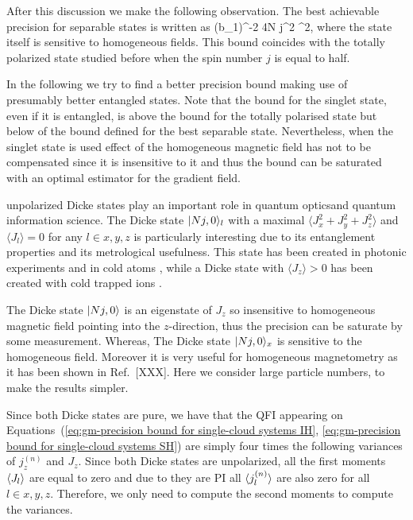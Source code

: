 After this discussion we make the following observation. The best achievable precision for separable states is written as
\be
(\Delta b_1)^{-2} \leqslant 4N j^2 \sigma^2,
\label{eq:gm-best_separable}
\ee
where the state itself is sensitive to homogeneous fields.
This bound coincides with the totally polarized state studied before when the spin number $j$ is equal to half.
\label{obs:precision bound for separable states}

In the following we try to find a better precision bound making use of presumably better entangled states.
Note that the bound for the singlet state, even if it is entangled, is above the bound for the totally polarised state but below of the bound defined for the best separable state.
Nevertheless, when the singlet state is used effect of the homogeneous magnetic field has not to be compensated since it is insensitive to it and thus the bound can be saturated with an optimal estimator for the gradient field.


unpolarized Dicke states play an important role in quantum opticsand quantum information science.
The Dicke state $\vert{Nj,0}\rangle_l$ with a maximal $\langle J_x^2+J_y^2+J_z^2 \rangle$ and $\langle J_l\rangle=0$ for any $l\in x,y,z$ is particularly interesting due to its entanglement properties and its metrological usefulness.
This state has been created in photonic experiments \cite{Kiesel2007,Wieczorek2009,Chiuri2012} and in cold atoms \cite{Luecke2011,Hamley2012}, while a Dicke state with $\langle J_z\rangle>0$ has been created with cold trapped ions \cite{haeffner2005}.

The Dicke state $\vert{Nj, 0}\rangle$ is an eigenstate of $J_z$ so insensitive to homogeneous magnetic field pointing into the $z$-direction, thus the precision can be saturate by some measurement.
Whereas, The Dicke state $\vert{Nj, 0}\rangle_x$ is sensitive to the homogeneous field.
Moreover it is very useful for homogeneous magnetometry as it has been shown in Ref.~[XXX].
Here we consider large particle numbers, to make the results simpler.

Since both Dicke states are pure, we have that
the QFI appearing on Equations~(\ref{eq:gm-precision bound for single-cloud
systems IH}, \ref{eq:gm-precision bound for single-cloud
systems SH}) are simply four times the following variances of $j_z^{(n)}$ and $J_z$.
Since both Dicke states are unpolarized, all the first moments $\langle{J_l}\rangle$ are equal to zero and due to they are PI all $\langle{j_l^{(n)}}\rangle$ are also zero for all $l\in x,y,z$.
Therefore, we only need to compute the second moments to compute the variances.


